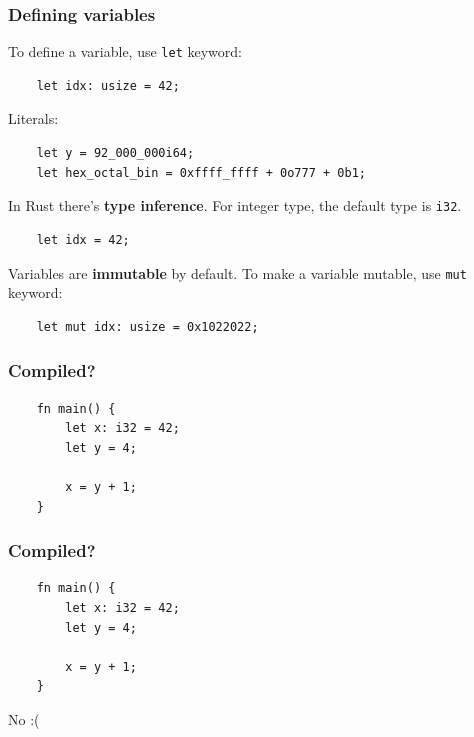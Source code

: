 \documentclass[aspectratio=1610,t]{beamer}
\begin{document}
\begin{frame}[fragile]
\frametitle{Defining variables}
To define a variable, use \texttt{let} keyword:

\begin{verbatim}
    let idx: usize = 42;
\end{verbatim}

Literals:

\begin{verbatim}
    let y = 92_000_000i64;
    let hex_octal_bin = 0xffff_ffff + 0o777 + 0b1;
\end{verbatim}

In Rust there's \textbf{type inference}. For integer type, the default type is \texttt{i32}.

\begin{verbatim}
    let idx = 42;
\end{verbatim}

Variables are \textbf{immutable} by default. To make a variable mutable, use \texttt{mut} keyword:

\begin{verbatim}
    let mut idx: usize = 0x1022022;
\end{verbatim}
\end{frame}


\begin{frame}[fragile]
\frametitle{Compiled?}

\begin{verbatim}
    fn main() {
        let x: i32 = 42;
        let y = 4;
        
        x = y + 1;
    }
\end{verbatim}

\end{frame}


\begin{frame}[fragile]
\frametitle{Compiled?}

\begin{verbatim}
    fn main() {
        let x: i32 = 42;
        let y = 4;
        
        x = y + 1;
    }
\end{verbatim}

No :(

\end{frame}
\end{document}
